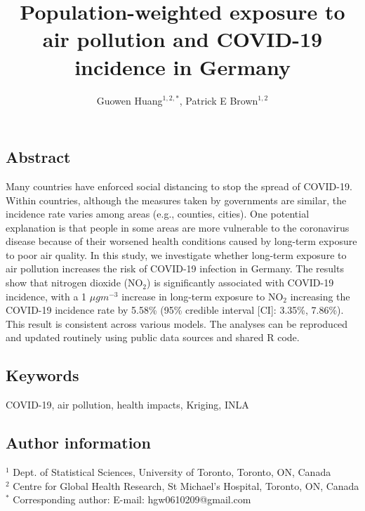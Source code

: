 \documentclass[12,]{article}
\title{Population-weighted exposure to air pollution and COVID-19 incidence in
Germany}
\author{Guowen Huang\(^{1,2,*}\), Patrick E Brown\(^{1,2}\)}
\date{}
\begin{document}
\maketitle

\hypertarget{abstract}{%
\subsection*{Abstract}\label{abstract}}

Many countries have enforced social distancing to stop the spread of
COVID-19. Within countries, although the measures taken by governments
are similar, the incidence rate varies among areas (e.g., counties,
cities). One potential explanation is that people in some areas are more
vulnerable to the coronavirus disease because of their worsened health
conditions caused by long-term exposure to poor air quality. In this
study, we investigate whether long-term exposure to air pollution
increases the risk of COVID-19 infection in Germany. The results show
that nitrogen dioxide (NO\(_2\)) is significantly associated with
COVID-19 incidence, with a 1 \(\mu gm^{-3}\) increase in long-term
exposure to NO\(_2\) increasing the COVID-19 incidence rate by 5.58\%
(95\% credible interval {[}CI{]}: 3.35\%, 7.86\%). This result is
consistent across various models. The analyses can be reproduced and
updated routinely using public data sources and shared R code.

\hypertarget{keywords}{%
\subsection*{Keywords}\label{keywords}}

COVID-19, air pollution, health impacts, Kriging, INLA

\hypertarget{author-information}{%
\subsection*{Author information}\label{author-information}}

\(^1\) Dept. of Statistical Sciences, University of Toronto, Toronto,
ON, Canada\\
\(^2\) Centre for Global Health Research, St Michael's Hospital,
Toronto, ON, Canada\\
\(^*\) Corresponding author: E-mail: hgw0610209@gmail.com
\end{document}
